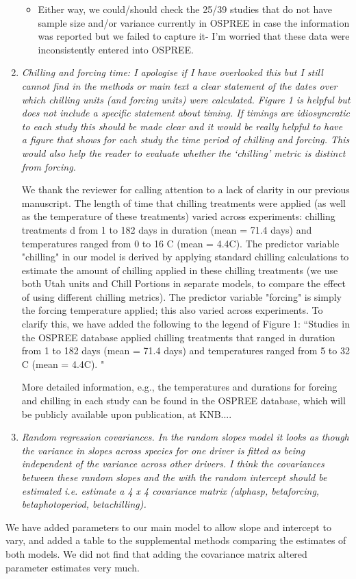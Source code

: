 \documentclass[11pt, a4paper]{article}
\begin{document}
\begin{enumerate}
\begin{itemize}
\item Either way, we could/should check the 25/39 studies that do not have sample size and/or variance currently in OSPREE in case the information was reported but we failed to capture it- I'm worried that these data were inconsistently entered into OSPREE. 
\end{itemize}
\item \emph{Chilling and forcing time: I apologise if I have overlooked this but I still cannot find in the
methods or main text a clear statement of the dates over which chilling units (and forcing
units) were calculated. Figure 1 is helpful but does not include a specific statement about
timing. If timings are idiosyncratic to each study this should be made clear and it would be
really helpful to have a figure that shows for each study the time period of chilling and forcing.
This would also help the reader to evaluate whether the `chilling' metric is distinct from
forcing.}
\par We thank the reviewer for calling attention to a lack of clarity in our previous manuscript. The length of time that chilling treatments were applied (as well as the temperature of these treatments) varied across experiments:  chilling treatments 
d from 1 to 182 days in duration (mean = 71.4 days) and temperatures ranged from  0 to 16 \degree C (mean = 4.4\degree C). The predictor variable "chilling" in our model is derived by applying standard chilling calculations to estimate the amount of chilling applied in these chilling treatments (we use both Utah units and Chill Portions in separate models, to compare the effect of using different chilling metrics). The predictor variable "forcing" is simply the forcing temperature applied; this also varied across experiments. 
To clarify this, we have added the following to the legend of Figure 1:
``Studies in the OSPREE database applied chilling treatments that ranged in duration from 1 to 182 days (mean = 71.4 days) and temperatures ranged from  5 to 32 \degree C (mean = 4.4\degree C). "

More detailed information, e.g., the temperatures and durations for forcing and chilling in each study can be found in the OSPREE database, which will be  publicly available upon publication, at KNB....

\item \emph{Random regression covariances. In the random slopes model it looks as though the variance in
slopes across species for one driver is fitted as being independent of the variance across other
drivers. I think the covariances between these random slopes and the with the random
intercept should be estimated i.e. estimate a 4 x 4 covariance matrix (alphasp, betaforcing,
betaphotoperiod, betachilling).}
\end{enumerate}
\par We have added parameters to our main model to allow slope and intercept to vary, and added a table to the supplemental methods comparing the estimates of both models. We did not find that adding the covariance matrix altered parameter estimates very much.
\end{document}
